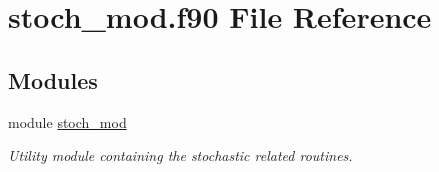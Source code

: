 \hypertarget{stoch__mod_8f90}{}\section{stoch\+\_\+mod.\+f90 File Reference}
\label{stoch__mod_8f90}
\subsection*{Modules}
\begin{DoxyCompactItemize}
\item 
module \hyperlink{namespacestoch__mod}{stoch\+\_\+mod}
\begin{DoxyCompactList}\small\item\em Utility module containing the stochastic related routines. \end{DoxyCompactList}\end{DoxyCompactItemize}
